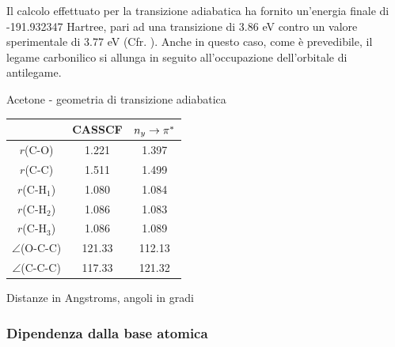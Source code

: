Il calcolo effettuato per la transizione adiabatica ha fornito un'energia finale di
-191.932347 Hartree, pari ad una transizione di 3.86 eV contro un valore sperimentale di 3.77 eV
(Cfr. \cite{jcp-111-1-1999-205}). Anche in questo caso, come \`e prevedibile,
il legame carbonilico si allunga in seguito all'occupazione dell'orbitale di
antilegame.
\begin{center}
\begin{threeparttable}
\caption{\small Acetone - geometria di transizione adiabatica}
\label{tab:acetone_geometrie_adiab}
\small
\begin{tabular}{|c|cc|}
\hline
				& CASSCF	& $n_y \rightarrow \pi^{*}$  \\
\hline
$r$(C-O)			& 1.221		& 1.397				\\
$r$(C-C)		& 1.511		& 1.499				 \\
$r$(C-H$_1$)		& 1.080		& 1.084		 		 \\
$r$(C-H$_2$)		& 1.086		& 1.083			 	 \\
$r$(C-H$_3$)		& 1.086		& 1.089			 	 \\
$\angle$(O-C-C)		& 121.33	& 112.13			 \\
$\angle$(C-C-C)		& 117.33	& 121.32			 \\
\hline
\end{tabular}
\begin{tablenotes}
\small
 \item[] Distanze in Angstroms, angoli in gradi
\end{tablenotes}
\end{threeparttable}
\end{center}

\subsubsection{Dipendenza dalla base atomica}

